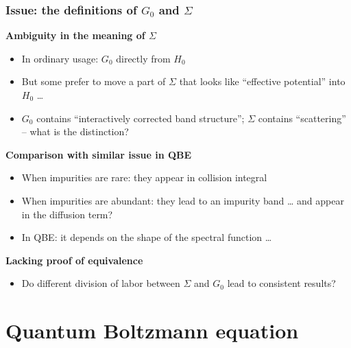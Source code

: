 \documentclass[t]{beamer}
\begin{document}
\begin{frame}
\frametitle{Issue: the definitions of $G_0$ and $\Sigma$}

\textbf{Ambiguity in the meaning of $\Sigma$}
\begin{itemize}
    \item In ordinary usage: $G_0$ directly from $H_0$
    \item But some prefer to move a part of $\Sigma$
        that looks like ``effective potential'' into $H_0$ \dots
    \item $G_0$ contains ``interactively corrected band structure'';
        $\Sigma$ contains ``scattering'' -- what is the distinction?
\end{itemize}    

\vspace{0.25cm}

\textbf{Comparison with similar issue in QBE} \begin{itemize}
    \item When impurities are rare: they appear in collision integral
    \item When impurities are abundant: they lead to an impurity band \dots
        and appear in the diffusion term?
    \item In QBE: 
        it depends on the shape of the spectral function \dots
\end{itemize}

\vspace{0.25cm}

\textbf{Lacking proof of equivalence} \begin{itemize}
    \item Do different division of labor between $\Sigma$ and $G_0$
        lead to consistent results?
\end{itemize}

\end{frame}

\section{Quantum Boltzmann equation}
\end{document}
